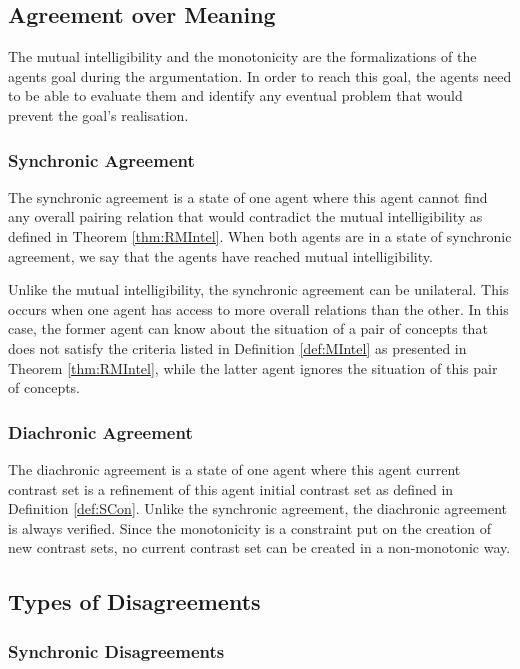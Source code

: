 \subsection{Agreement over Meaning}\label{sec:Agree}

The mutual intelligibility and the monotonicity are the formalizations of the agents goal during the argumentation. In order to reach this goal, the agents need to be able to evaluate them and identify any eventual problem that would prevent the goal's realisation.

\subsubsection{Synchronic Agreement}\label{sec:SynAg}

The synchronic agreement is a state of one agent where this agent cannot find any overall pairing relation that would contradict the mutual intelligibility as defined in Theorem \ref{thm:RMIntel}. When both agents are in a state of synchronic agreement, we say that the agents have reached mutual intelligibility.

Unlike the mutual intelligibility, the synchronic agreement can be unilateral. This occurs when one agent has access to more overall relations than the other. In this case, the former agent can know about the situation of a pair of concepts that does not satisfy the criteria listed in Definition \ref{def:MIntel} as presented in Theorem \ref{thm:RMIntel}, while the latter agent ignores the situation of this pair of concepts.

\subsubsection{Diachronic Agreement}\label{sec:DiaAg}

The diachronic agreement is a state of one agent where this agent current contrast set is a refinement of this agent initial contrast set as defined in Definition \ref{def:SCon}. Unlike the synchronic agreement, the diachronic agreement is always verified. Since the monotonicity is a constraint put on the creation of new contrast sets, no current contrast set can be created in a non-monotonic way.

\subsection{Types of Disagreements}\label{sec:Disagree} 

\subsubsection{Synchronic Disagreements}\label{sec:SynD}

